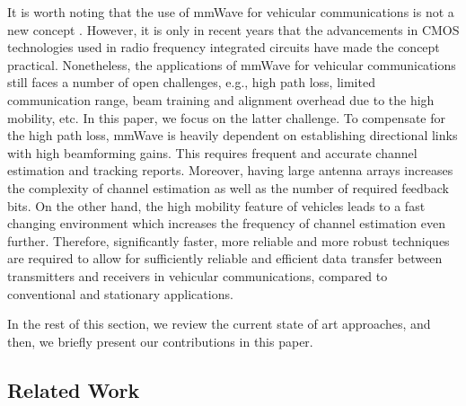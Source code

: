 \documentclass{ieeeaccess}
\begin{document}
It is worth noting that the use of mmWave for vehicular communications is not a new concept \cite{r4}. However, it is only in recent years that the advancements in CMOS technologies used in radio frequency integrated circuits have made the concept practical. Nonetheless, the applications of mmWave for vehicular communications still faces a number of open challenges, e.g., high path loss, limited communication range, beam training and alignment overhead due to the high mobility, etc. In this paper, we focus on the latter challenge. To compensate for the high path loss, mmWave is heavily dependent on establishing directional links with high beamforming gains. This requires frequent and accurate channel estimation and tracking reports. Moreover, having large antenna arrays increases the complexity of channel estimation as well as the number of required feedback bits.  On the other hand, the high mobility feature of vehicles leads to a fast changing environment which increases the frequency of channel estimation even further. Therefore, significantly faster, more reliable and more robust techniques are required to allow for sufficiently reliable and efficient data transfer between transmitters and receivers in vehicular communications, compared to conventional and stationary applications.

In the rest of this section, we review the current state of art approaches, and then, we briefly present our contributions in this paper.


\subsection{Related Work}
\end{document}
